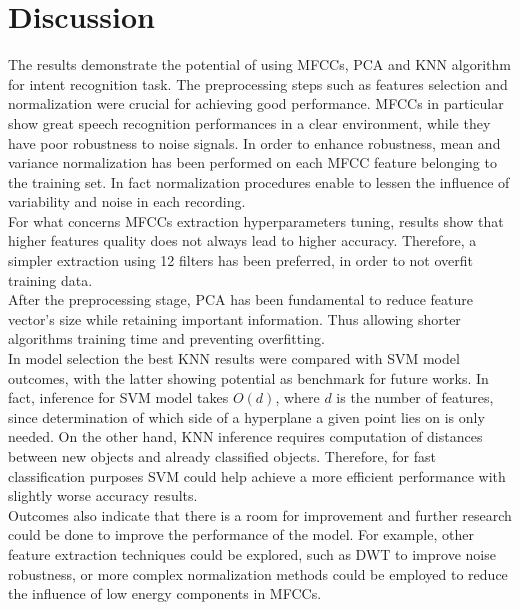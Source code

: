 \documentclass[conference]{IEEEtran}
\begin{document}
\section{Discussion}
The results demonstrate the potential of using MFCCs, PCA and KNN algorithm for intent recognition task.
The preprocessing steps such as features selection and normalization were crucial for achieving good performance.
MFCCs in particular show great speech recognition performances in a clear environment, while they have poor robustness to noise signals.
In order to enhance robustness, mean and variance normalization has been performed on each MFCC feature belonging to the training set.
In fact normalization procedures enable to lessen the influence of variability  and noise in each recording.\\
For what concerns MFCCs extraction hyperparameters tuning, results show that higher features quality does not always lead to higher accuracy. 
Therefore, a simpler extraction using 12 filters has been preferred, in order to not overfit training data.\\
After the preprocessing stage, PCA has been fundamental to reduce feature vector's size while retaining important information. Thus allowing shorter algorithms training time and preventing overfitting.\\
In model selection the best KNN results were compared with SVM model outcomes, with the latter showing potential as benchmark for future works.
In fact, inference for SVM model takes $O(d)$, where $d$ is the number of features, since determination of which side of a hyperplane a given point lies on is only needed.
On the other hand, KNN inference requires computation of distances between new objects and already classified objects.
Therefore, for fast classification purposes SVM could help achieve a more efficient performance with slightly worse accuracy results.\\
Outcomes also indicate that there is a room for improvement and further research could be done to improve the performance of the model.
For example, other feature extraction techniques could be explored, such as DWT to improve noise robustness, or more complex normalization methods could be employed to reduce the influence of low energy components in MFCCs.\\


\nocite{*}


\end{document}
